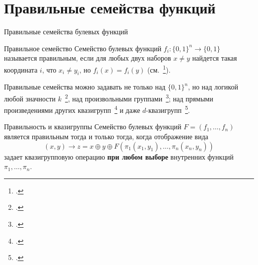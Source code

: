 \section{Правильные семейства функций}


\begin{frame}{Правильные семейства булевых функций}
    \begin{block}{Правильное семейство}
        Семейство булевых функций $f_i \colon \{0, 1\}^n \to \{0, 1\}$ называется правильным, если для любых двух наборов $x \ne y$ найдется такая координата $i$, что $x_i \ne y_i$, но $f_i(x) = f_i(y)$ (см.~\footcite{nosov98, nosov99}).
    \end{block}
    \pause 

    Правильные семейства можно задавать не только над $\{0, 1\}^n$, но над логикой любой значности $k$~\footcite{nosov06}, над произвольными группами~\footcite{nosov06abel}; над прямыми произведениями других квазигрупп~\footcite{galatenko2020latin} и даже $d$-квазигрупп~\footcite{plaksina14}.

    \pause 
    \begin{block}{Правильность и квазигруппы}
        Семейство булевых функций $F = (f_1, \ldots, f_n)$ является правильным тогда и только тогда, когда отображение вида 
        \[
            (x, y) \to z = x \oplus y \oplus F(\pi_1(x_1, y_1), \ldots, \pi_n(x_n, y_n))
        \]
        задает квазигрупповую операцию \textbf{при любом выборе} внутренних функций $\pi_1, \ldots, \pi_n$.
    \end{block}
\end{frame}


